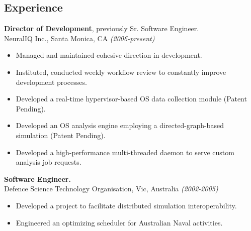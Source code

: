 \documentclass[margin]{res}
\begin{document}
\begin{resume}
\section{Experience}
\noindent
{\bf Director of Development}, previously Sr. Software Engineer. \\
NeuralIQ Inc., Santa Monica, CA {\em (2006-present)} \\
\begin{itemize}
  \item Managed and maintained cohesive direction in development.
  \item Instituted, conducted weekly workflow review to constantly improve development processes.
  \item Developed a real-time hypervisor-based OS data collection module (Patent Pending).
  \item Developed an OS analysis engine employing a directed-graph-based simulation (Patent Pending).
  \item Developed a high-performance multi-threaded daemon to serve custom analysis job requests.
\end{itemize}


{\bf Software Engineer.} \\
Defence Science Technology Organisation, Vic, Australia {\em (2002-2005)}  \\
\begin{itemize}
  \item Developed a project to facilitate distributed simulation interoperability.
  \item Engineered an optimizing scheduler for Australian Naval activities.
\end{itemize}



\end{resume}
\end{document}
